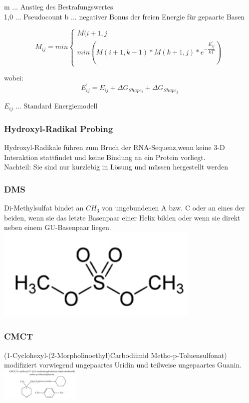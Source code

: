 m ... Anstieg des Bestrafungswertes \\
1,0 ... Pseudocount
b ... negativer Bonus der freien Energie für gepaarte Basen

\begin{equation}
M_{ij} = min
\begin{cases} 
M(i+1,j \\
min (M(i+1,k-1)*M(k+1,j)*e^{-\dfrac{E^{'}_{ij}}{kT}})
\end{cases}
\end{equation}

wobei:
\begin{equation}
E^{'}_{ij} = E_{ij} + \Delta G_{Shape_i} + \Delta G_{Shape_j}
\end{equation}

$E_{ij}$ ... Standard Energiemodell

\subsubsection{Hydroxyl-Radikal Probing}
Hydroxyl-Radikale führen zum Bruch der RNA-Sequenz,wenn keine 3-D Interaktion stattfindet und keine Bindung an ein Protein vorliegt.\\
Nachteil: Sie sind nur kurzlebig in Lösung und müssen hergestellt werden

\subsubsection{DMS}
Di-Methylsulfat bindet an $CH_3$ von ungebundenen A bzw. C oder an eines der beiden, wenn sie das letzte Basenpaar einer Helix bilden oder wenn sie direkt neben einem GU-Basenpaar liegen. \\
\includegraphics[scale=0.3]{lectures/160527/pix/Dimethylsulfat.jpg} \\

\subsubsection{CMCT}
(1-Cyclohexyl-(2-Morpholinoethyl)Carbodiimid Metho-p-Toluensulfonat) modifiziert vorwiegend ungepaartes Uridin und teilweise ungepaartes Guanin. \\
\includegraphics[scale=1]{lectures/160527/pix/CMCT.jpg} \\

